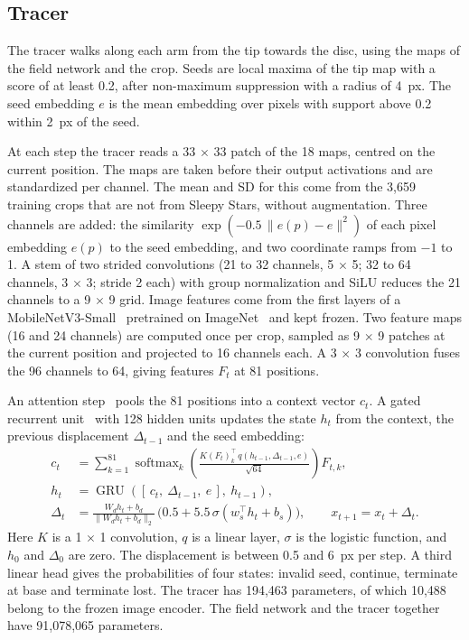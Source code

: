\subsection*{Tracer}

The tracer walks along each arm from the tip towards the disc, using the maps of the field network and the crop.
Seeds are local maxima of the tip map with a score of at least 0.2, after non-maximum suppression with a radius of 4~px.
The seed embedding $e$ is the mean embedding over pixels with support above 0.2 within 2~px of the seed.

At each step the tracer reads a 33 $\times$ 33 patch of the 18 maps, centred on the current position.
The maps are taken before their output activations and are standardized per channel.
The mean and SD for this come from the 3,659 training crops that are not from Sleepy Stars, without augmentation.
Three channels are added: the similarity $\exp(-0.5\,\lVert e(p) - e\rVert^2)$ of each pixel embedding $e(p)$ to the seed embedding, and two coordinate ramps from $-1$ to 1.
A stem of two strided convolutions (21 to 32 channels, 5 $\times$ 5; 32 to 64 channels, 3 $\times$ 3; stride 2 each) with group normalization and SiLU reduces the 21 channels to a 9 $\times$ 9 grid.
Image features come from the first layers of a MobileNetV3-Small~\cite{howard2019searching} pretrained on ImageNet~\cite{deng2009imagenet} and kept frozen.
Two feature maps (16 and 24 channels) are computed once per crop, sampled as 9 $\times$ 9 patches at the current position and projected to 16 channels each.
A 3 $\times$ 3 convolution fuses the 96 channels to 64, giving features $F_t$ at 81 positions.

An attention step~\cite{vaswani2017attention} pools the 81 positions into a context vector $c_t$.
A gated recurrent unit~\cite{cho2014learning} with 128 hidden units updates the state $h_t$ from the context, the previous displacement $\Delta_{t-1}$ and the seed embedding:
\begin{equation}
\begin{aligned}
c_t &= \sum_{k=1}^{81} \operatorname{softmax}_k\!\left(\frac{K(F_t)_k^{\top}\, q(h_{t-1},\Delta_{t-1},e)}{\sqrt{64}}\right) F_{t,k}, \\
h_t &= \operatorname{GRU}\!\left([\,c_t,\ \Delta_{t-1},\ e\,],\ h_{t-1}\right), \\
\Delta_t &= \frac{W_d h_t + b_d}{\lVert W_d h_t + b_d\rVert_2}\,\bigl(0.5 + 5.5\,\sigma(w_s^{\top} h_t + b_s)\bigr), \qquad x_{t+1} = x_t + \Delta_t .
\end{aligned}
\label{eq:s1step}
\end{equation}
Here $K$ is a 1 $\times$ 1 convolution, $q$ is a linear layer, $\sigma$ is the logistic function, and $h_0$ and $\Delta_0$ are zero.
The displacement is between 0.5 and 6~px per step.
A third linear head gives the probabilities of four states: invalid seed, continue, terminate at base and terminate lost.
The tracer has 194,463 parameters, of which 10,488 belong to the frozen image encoder.
The field network and the tracer together have 91,078,065 parameters.

